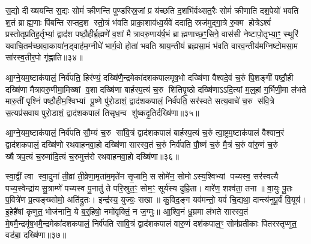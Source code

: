 {\anuvakamend[{आ॒ग्ने॒यं द्विच॑त्वारिशत्॥17॥}]}

स॒द्यो दीख्षयन्ति स॒द्यः सोमं॑ क्रीणन्ति पुण्डरिस्र॒जां प्र य॑च्छति द॒शभि॑र्वथ्सत॒रैः सोमं॑ क्रीणाति दश॒पेयो॑ भवति श॒तं ब्राह्म॒णाः पि॑बन्ति सप्तद॒श स्तो॒त्रं भ॑वति प्राका॒शाव॑ध्व॒र्यवे॑ ददाति॒ स्रज॑मुद्गा॒त्रे रु॒क्म होत्रेऽश्वं॑ प्रस्तोतृप्रतिह॒र्तृभ्यां॒ द्वाद॑श पष्ठौ॒हीर्ब्र॒ह्मणे॑ व॒शां मैत्रावरु॒णाय॑र्\mbox{}ष॒भं ब्राह्मणाच्छ॒ꣳ॒सिने॒ वास॑सी नेष्टापो॒तृभ्या॒ꣳ॒ स्थूरि॑ यवाचि॒तम॑च्छावा॒काया॑न॒ड्वाह॑म॒ग्नीधे॑ भार्ग॒वो होता॑ भवति श्राय॒न्तीयं॑ ब्रह्मसा॒मं भ॑वति वारव॒न्तीय॑मग्निष्टोमसा॒म सा॑रस्व॒तीर॒पो गृ॑ह्णाति॥३४॥

{\anuvakamend[{वा॒र॒व॒न्तीयं॑ च॒त्वारि॑ च॥18॥}]}

आ॒ग्ने॒यम॒ष्टाक॑पालं॒ निर्व॑पति॒ हिर॑ण्यं॒ दख्षि॑णै॒न्द्रमेका॑दशकपालमृष॒भो दख्षि॑णा वैश्वदे॒वं च॒रुं पि॒शङ्गी॑ पष्ठौ॒ही दख्षि॑णा मैत्रावरु॒णीमा॒मिख्षां व॒शा दख्षि॑णा बार्\mbox{}हस्प॒त्यं च॒रु शि॑तिपृ॒ष्ठो दख्षि॑णाऽऽदि॒त्यां म॒ल्॒\mbox{}हां ग॒र्भिणी॒मा ल॑भते मारु॒तीं पृश्निं॑ पष्ठौ॒हीम॒श्विभ्यां पू॒ष्णे पु॑रो॒डाशं॒ द्वाद॑शकपालं॒ निर्व॑पति॒ सर॑स्वते सत्य॒वाचे॑ च॒रु स॑वि॒त्रे स॒त्यप्र॑सवाय पुरो॒डाशं॒ द्वाद॑शकपालं तिसृध॒न्व शु॑ष्कदृ॒तिर्दख्षि॑णा॥३५॥

{\anuvakamend[{आ॒ग्ने॒य स॒प्तच॑त्वारिशत्॥19॥}]}

आ॒ग्ने॒यम॒ष्टाक॑पालं॒ निर्व॑पति सौ॒म्यं च॒रु सा॑वि॒त्रं द्वाद॑शकपालं बार्\mbox{}हस्प॒त्यं च॒रुं त्वा॒ष्ट्रम॒ष्टाक॑पालं वैश्वान॒रं द्वाद॑शकपालं॒ दख्षि॑णो रथवाहनवा॒हो दख्षि॑णा सारस्व॒तं च॒रुं निर्व॑पति पौ॒ष्णं च॒रुं मै॒त्रं च॒रुं वा॑रु॒णं च॒रुं ख्षैत्रप॒त्यं च॒रुमा॑दि॒त्यं च॒रुमुत्त॑रो रथवाहनवा॒हो दख्षि॑णा॥३६॥

{\anuvakamend[{आ॒ग्ने॒यं चतु॑स्त्रिशत्॥20॥}]}

स्वा॒द्वीं त्वा स्वा॒दुना॑ ती॒व्रां ती॒व्रेणा॒मृता॑म॒मृते॑न सृ॒जामि॒ ससोमे॑न॒ सोमोऽस्य॒श्विभ्यां पच्यस्व॒ सर॑स्वत्यै पच्य॒स्वेन्द्रा॑य सु॒त्राम्णे॑ पच्यस्व पु॒नातु॑ ते परि॒स्रुत॒ꣳ॒ सोम॒ꣳ॒ सूर्य॑स्य दुहि॒ता। वारे॑ण॒ शश्व॑ता॒ तना॥ वा॒युः पू॒तः प॒वित्रे॑ण प्र॒त्यङ्ख्सोमो॒ अति॑द्रुतः। इन्द्र॑स्य॒ युज्यः॒ सखा॥ कु॒विद॒ङ्ग यव॑मन्तो॒ यवं॑ चि॒द्यथा॒ दान्त्य॑नुपू॒र्वं वि॒यूय॑। इ॒हेहै॑षां कृणुत॒ भोज॑नानि॒ ये ब॒र्॒\mbox{}हिषो॒ नमो॑वृक्तिं॒ न ज॒ग्मुः॥ आ॒श्वि॒नं धू॒म्रमा ल॑भते सारस्व॒तं मे॒षमै॒न्द्रमृ॑ष॒भमै॒न्द्रमेका॑दशकपालं॒ निर्व॑पति सावि॒त्रं द्वाद॑शकपालं वारु॒णं दश॑कपाल॒ꣳ॒ सोम॑प्रतीकाः पितरस्तृप्णुत॒ वड॑बा॒ दख्षि॑णा॥३७॥

{\anuvakamend[{भोज॑नानि॒ षड््विꣳ॑शतिश्च॥21॥}]}

